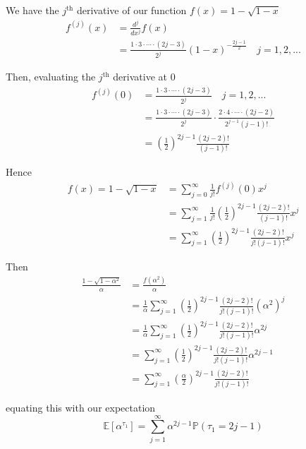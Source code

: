 \documentclass[12pt]{article}
\renewcommand{\P}{\mathbb P}
\newcommand{\E}{\mathbb E}
\begin{document}
We have the $j^\text{th}$ derivative of our function $f(x) = 1 - \sqrt{1 - x}$ 
\begin{align*}
	f^{(j)}(x) &= \frac{ d^j }{ dx^j }f(x) \\
	&= \frac{1\cdot3\cdot\cdots\cdot(2j - 3)}{2^j} (1 - x)^{-\frac{2j - 1}{2}} \quad j = 1,2,...
\end{align*}

Then, evaluating the $j^\text{th}$ derivative at 0
\begin{align*}
	f^{(j)}(0) &= \frac{1\cdot3\cdot\cdots\cdot(2j - 3)}{2^j} \quad j = 1,2,... \\
	&=  \frac{1\cdot3\cdot\cdots\cdot(2j - 3)}{2^j} \cdot \frac{2\cdot4\cdot\cdots\cdot(2j - 2)}{2^{j - 1}(j - 1)!  } \\
	&= \left( \frac{1}{2} \right)^{2j - 1} \frac{ (2j - 2)! }{ (j - 1)! }
\end{align*}

Hence
\begin{align*}
	f(x) = 1 - \sqrt{1 - x} &= \sum^\infty_{j = 0} \frac{1}{j!} f^{(j)} (0) x^j \\
	&= \sum^\infty_{j = 1} \frac{1}{j!} \left( \frac{1}{2} \right)^{2j - 1} \frac{ (2j - 2)! }{ (j - 1)! } x^j \\
	&= \sum^\infty_{j = 1} \left( \frac{1}{2} \right)^{2j - 1} \frac{ (2j - 2)! }{ j!(j - 1)! } x^j
\end{align*}

Then
\begin{align*}
	\frac{ 1 - \sqrt{1 - \alpha^2} }{ \alpha } &= \frac{ f(\alpha^2) }{ \alpha } \\
	&= \frac{1}{\alpha} \sum^\infty_{j = 1} \left( \frac{1}{2} \right)^{2j - 1} \frac{ (2j - 2)! }{ j!(j - 1)! } \left(\alpha^2\right)^j \\
	&= \frac{1}{\alpha} \sum^\infty_{j = 1} \left( \frac{1}{2} \right)^{2j - 1} \frac{ (2j - 2)! }{ j!(j - 1)! } \alpha^{2j} \\
	&= \sum^\infty_{j = 1} \left( \frac{1}{2} \right)^{2j - 1} \frac{ (2j - 2)! }{ j!(j - 1)! } \alpha^{2j - 1} \\
	&= \sum^\infty_{j = 1} \left( \frac{\alpha}{2} \right)^{2j - 1} \frac{ (2j - 2)! }{ j!(j - 1)! } 
\end{align*}

equating this with our expectation
\begin{equation*}
	\E[\alpha^{\tau_1}] = \sum^\infty_{j = 1} \alpha^{2j - 1} \P(\tau_1 = 2j - 1)
\end{equation*}
\end{document}
